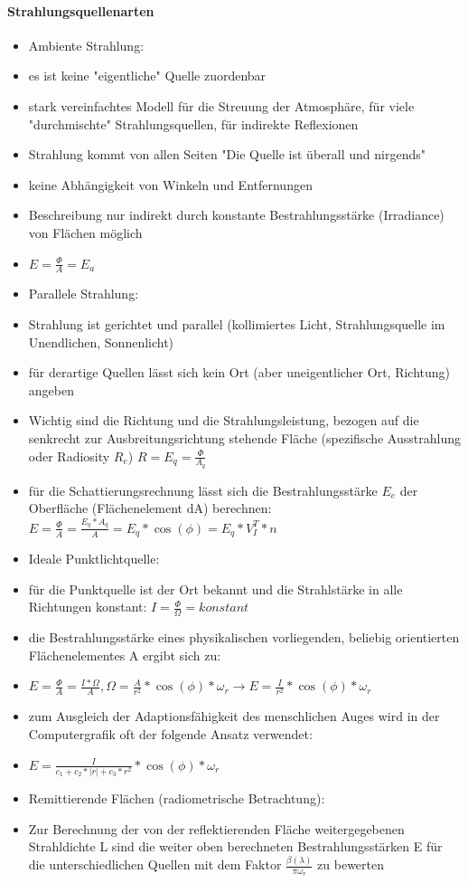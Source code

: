 \documentclass[10pt,landscape]{article}
\begin{document}
\begin{multicols}{3}
{  \paragraph{Strahlungsquellenarten}
  \begin{itemize}
    \item Ambiente Strahlung:
    \item es ist keine "eigentliche" Quelle zuordenbar
    \item stark vereinfachtes Modell für die Streuung der Atmosphäre, für viele "durchmischte" Strahlungsquellen, für indirekte Reflexionen
    \item Strahlung kommt von allen Seiten "Die Quelle ist überall und nirgends"
    \item keine Abhängigkeit von Winkeln und Entfernungen
    \item Beschreibung nur indirekt durch konstante Bestrahlungsstärke (Irradiance) von Flächen möglich
    \item $E=\frac{\Phi}{A}=E_a$
    \item Parallele Strahlung:
    \item Strahlung ist gerichtet und parallel (kollimiertes Licht, Strahlungsquelle im Unendlichen, Sonnenlicht)
    \item für derartige Quellen lässt sich kein Ort (aber uneigentlicher Ort, Richtung) angeben
    \item Wichtig sind die Richtung und die Strahlungsleistung, bezogen auf die senkrecht zur Ausbreitungsrichtung stehende Fläche (spezifische Ausstrahlung oder Radiosity $R_e$) $R=E_q=\frac{\Phi}{A_q}$
    \item für die Schattierungsrechnung lässt sich die Bestrahlungsstärke $E_e$ der Oberfläche (Flächenelement dA) berechnen: $E=\frac{\Phi}{A}=\frac{E_q*A_q}{A}=E_q*\cos(\phi) = E_q*V_I^T*n$
    \item Ideale Punktlichtquelle:
    \item für die Punktquelle ist der Ort bekannt und die Strahlstärke in alle Richtungen konstant: $I=\frac{\Phi}{\Omega}=konstant$
    \item die Bestrahlungsstärke eines physikalischen vorliegenden, beliebig orientierten Flächenelementes A ergibt sich zu:
    \item $E=\frac{\Phi}{A}=\frac{I*\Omega}{A}, \Omega=\frac{A}{r^2}*\cos(\phi)*\omega_r \rightarrow E=\frac{I}{r^2}*\cos(\phi)*\omega_r$
    \item zum Ausgleich der Adaptionsfähigkeit des menschlichen Auges wird in der Computergrafik oft der folgende Ansatz verwendet:
    \item $E=\frac{I}{c_1+c_2*|r|+c_3*r^2}*\cos(\phi)*\omega_r$
    \item Remittierende Flächen (radiometrische Betrachtung):
    \item Zur Berechnung der von der reflektierenden Fläche weitergegebenen Strahldichte L sind die weiter oben berechneten Bestrahlungsstärken E für die unterschiedlichen Quellen mit dem Faktor $\frac{\beta(\lambda)}{\pi\omega_r}$ zu bewerten
  \end{itemize}
  
}
\end{multicols}
\end{document}
